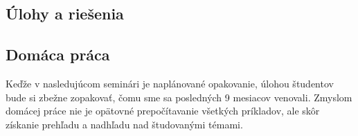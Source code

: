 



\subsection*{Úlohy a riešenia}











\subsection*{Domáca práca}

Keďže v nasledujúcom seminári je naplánované opakovanie, úlohou študentov bude si zbežne zopakovať, čomu sme sa posledných 9 mesiacov venovali. Zmyslom domácej práce nie je opätovné prepočítavanie všetkých príkladov, ale skôr získanie prehľadu a nadhľadu nad študovanými témami.

